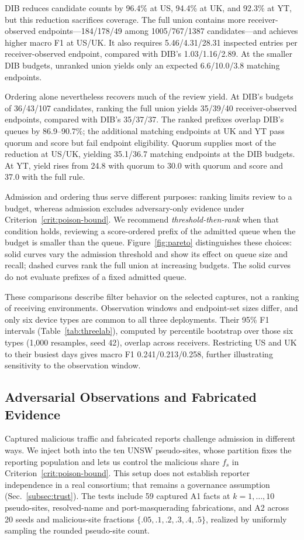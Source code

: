 \documentclass[journal]{IEEEtran}
\theoremstyle{definition}
\begin{document}
DIB reduces candidate counts by 96.4\% at US, 94.4\% at UK, and 92.3\% at YT, but this reduction sacrifices coverage. The full union contains more receiver-observed endpoints---184/178/49 among 1005/767/1387 candidates---and achieves higher macro F1 at US/UK. It also requires 5.46/4.31/28.31 inspected entries per receiver-observed endpoint, compared with DIB's 1.03/1.16/2.89. At the smaller DIB budgets, unranked union yields only an expected 6.6/10.0/3.8 matching endpoints.

Ordering alone nevertheless recovers much of the review yield. At DIB's budgets of 36/43/107 candidates, ranking the full union yields 35/39/40 receiver-observed endpoints, compared with DIB's 35/37/37. The ranked prefixes overlap DIB's queues by 86.9--90.7\%; the additional matching endpoints at UK and YT pass quorum and score but fail endpoint eligibility. Quorum supplies most of the reduction at US/UK, yielding 35.1/36.7 matching endpoints at the DIB budgets. At YT, yield rises from 24.8 with quorum to 30.0 with quorum and score and 37.0 with the full rule.

Admission and ordering thus serve different purposes: ranking limits review to a budget, whereas admission excludes adversary-only evidence under Criterion~\ref{crit:poison-bound}. We recommend \emph{threshold-then-rank} when that condition holds, reviewing a score-ordered prefix of the admitted queue when the budget is smaller than the queue. Figure~\ref{fig:pareto} distinguishes these choices: solid curves vary the admission threshold and show its effect on queue size and recall; dashed curves rank the full union at increasing budgets. The solid curves do not evaluate prefixes of a fixed admitted queue.


These comparisons describe filter behavior on the selected captures, not a ranking of receiving environments. Observation windows and endpoint-set sizes differ, and only six device types are common to all three deployments. Their 95\% F1 intervals (Table~\ref{tab:threelab}), computed by percentile bootstrap over those six types (1,000 resamples, seed 42), overlap across receivers. Restricting US and UK to their busiest days gives macro F1 0.241/0.213/0.258, further illustrating sensitivity to the observation window.

\subsection{Adversarial Observations and Fabricated Evidence}
\label{sec:security-results}
Captured malicious traffic and fabricated reports challenge admission in different ways. We inject both into the ten UNSW pseudo-sites, whose partition fixes the reporting population and lets us control the malicious share $f_s$ in Criterion~\ref{crit:poison-bound}. This setup does not establish reporter independence in a real consortium; that remains a governance assumption (Sec.~\ref{subsec:trust}). The tests include 59 captured A1 facts at $k=1,\ldots,10$ pseudo-sites, resolved-name and port-masquerading fabrications, and A2 across 20 seeds and malicious-site fractions $\{.05,.1,.2,.3,.4,.5\}$, realized by uniformly sampling the rounded pseudo-site count.
\end{document}
